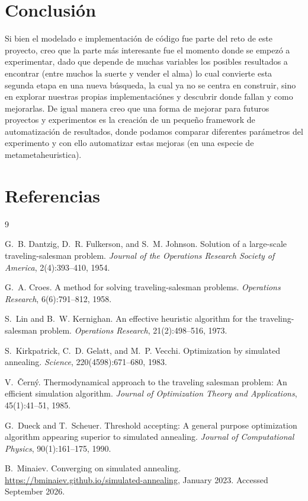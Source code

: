 \documentclass[11pt,letterpaper]{article}
\begin{document}
\section{Conclusión}
Si bien el modelado e implementación de código fue parte del reto de este proyecto, creo que la parte más interesante fue el momento donde se empezó a experimentar, dado que depende de muchas variables los posibles resultados a encontrar (entre muchos la suerte y vender el alma) lo cual convierte esta segunda etapa en una nueva búsqueda, la cual ya no se centra en construir, sino en explorar nuestras propias implementaciónes y descubrir donde fallan y como mejorarlas. De igual manera creo que una forma de mejorar para futuros proyectos y experimentos es la creación de un pequeño framework de automatización de resultados, donde podamos comparar diferentes parámetros del experimento y con ello automatizar estas mejoras (en una especie de metametaheuristica).

\section*{Referencias}
\begin{thebibliography}{9}

G.~B. Dantzig, D.~R. Fulkerson, and S.~M. Johnson.
\newblock Solution of a large-scale traveling-salesman problem.
\newblock \emph{Journal of the Operations Research Society of America}, 2(4):393--410, 1954.

G.~A. Croes.
\newblock A method for solving traveling-salesman problems.
\newblock \emph{Operations Research}, 6(6):791--812, 1958.

S.~Lin and B.~W. Kernighan.
\newblock An effective heuristic algorithm for the traveling-salesman problem.
\newblock \emph{Operations Research}, 21(2):498--516, 1973.

S.~Kirkpatrick, C.~D. Gelatt, and M.~P. Vecchi.
\newblock Optimization by simulated annealing.
\newblock \emph{Science}, 220(4598):671--680, 1983.

V.~Černý.
\newblock Thermodynamical approach to the traveling salesman problem: An efficient simulation algorithm.
\newblock \emph{Journal of Optimization Theory and Applications}, 45(1):41--51, 1985.

G.~Dueck and T.~Scheuer.
\newblock Threshold accepting: A general purpose optimization algorithm appearing superior to simulated annealing.
\newblock \emph{Journal of Computational Physics}, 90(1):161--175, 1990.

B.~Minaiev.
\newblock Converging on simulated annealing.
\newblock \url{https://bminaiev.github.io/simulated-annealing}, January 2023. Accessed September 2026.

\end{thebibliography}
\end{document}
